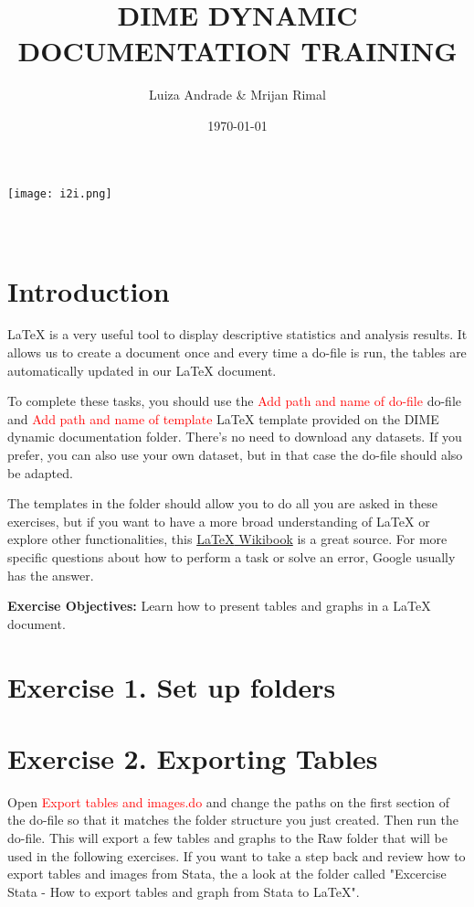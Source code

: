 \documentclass[12pts]{report}
\title{DIME DYNAMIC DOCUMENTATION TRAINING }
\author{Luiza Andrade \& Mrijan Rimal}
\date{\today}
\begin{document}
	

\makeatletter
\begin{titlepage}
	\begin{center}
		\texttt{[image: i2i.png]}\\[10ex]
		{\LARGE \bfseries  \@title }\\[2ex] 
		{\Large  \@author}\\[20ex] 
		{\large \@date}
	\end{center}
\end{titlepage}
\makeatother

\section*{Introduction}
{\LaTeX} is a very useful tool to display descriptive statistics and analysis results. It allows us to create a document once and every time a do-file is run, the tables are automatically updated in our LaTeX document. 

To complete these tasks, you should use the \textcolor{red}{Add path and name of do-file} do-file and \textcolor{red}{Add path and name of template} {\LaTeX} template provided on the DIME dynamic documentation folder. There's no need to download any datasets. If you prefer, you can also use your own dataset, but in that case the do-file should also be adapted. 

The templates in the folder should allow you to do all you are asked in these exercises, but if you want to have a more broad understanding of {\LaTeX} or explore other functionalities, this \href{https://en.wikibooks.org/wiki/LaTeX
}{{\LaTeX} Wikibook} is a great source. For more specific questions about how to perform a task or solve an error, Google usually has the answer.

\textbf{Exercise Objectives:} Learn how to present tables and graphs in a {\LaTeX} document.

\section*{Exercise 1. Set up folders}

\section*{Exercise 2. Exporting Tables}
Open \textcolor{red}{Export tables and images.do} and change the paths on the first section of the do-file so that it matches the folder structure you just created. Then run the do-file. This will export a few tables and graphs to the Raw folder that will be used in the following exercises. If you want to take a step back and review how to export tables and images from Stata, the a look at the folder called "Excercise Stata - How to export tables and graph from Stata to LaTeX".
\end{document}
